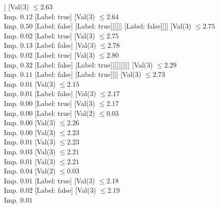 \documentclass[margin=10pt]{standalone}
\begin{document}
\begin{forest}
																		[Label: false]
																		[Val($3$) $ \leq 2.61$ \\ Imp. $0.04$
																			[Val($3$) $ \leq 2.61$ \\ Imp. $0.50$
																				[Label: true]
																				[Label: false]]
																			[Val($3$) $ \leq 2.63$ \\ Imp. $0.12$
																				[Label: true]
																				[Val($3$) $ \leq 2.64$ \\ Imp. $0.50$
																					[Label: false]
																					[Label: true]]]]]]
																[Label: false]]]]
													[Val($3$) $ \leq 2.75$ \\ Imp. $0.02$
														[Label: true]
														[Val($3$) $ \leq 2.75$ \\ Imp. $0.13$
															[Label: false]
															[Val($3$) $ \leq 2.78$ \\ Imp. $0.02$
																[Label: true]
																[Val($3$) $ \leq 2.80$ \\ Imp. $0.32$
																	[Label: false]
																	[Label: true]]]]]]]]]]
								[Val($3$) $ \leq 2.29$ \\ Imp. $0.11$
									[Label: false]
									[Label: true]]]]
						[Val($3$) $ \leq 2.73$ \\ Imp. $0.01$
							[Val($3$) $ \leq 2.15$ \\ Imp. $0.01$
								[Label: false]
								[Val($3$) $ \leq 2.17$ \\ Imp. $0.00$
									[Label: true]
									[Val($3$) $ \leq 2.17$ \\ Imp. $0.00$
										[Label: true]
										[Val($2$) $ \leq 0.03$ \\ Imp. $0.00$
											[Val($3$) $ \leq 2.26$ \\ Imp. $0.00$
												[Val($3$) $ \leq 2.23$ \\ Imp. $0.01$
													[Val($3$) $ \leq 2.23$ \\ Imp. $0.03$
														[Val($3$) $ \leq 2.21$ \\ Imp. $0.01$
															[Val($3$) $ \leq 2.21$ \\ Imp. $0.04$
																[Val($2$) $ \leq 0.03$ \\ Imp. $0.01$
																	[Label: true]
																	[Val($3$) $ \leq 2.18$ \\ Imp. $0.02$
																		[Label: false]
																		[Val($3$) $ \leq 2.19$ \\ Imp. $0.01$

\end{forest}
\end{document}
